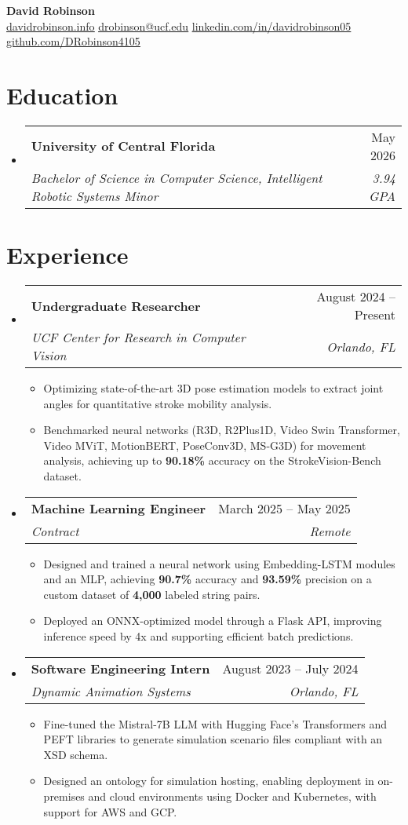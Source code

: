 \documentclass[letterpaper,11pt]{article}
\makeatletter
\newcommand{\resumeItem}[1]{
  \item\small{
    {#1 \vspace{-2pt}}
  }
}
\newcommand{\resumeSubheading}[4]{
  \vspace{-2pt}\item
    \begin{tabular*}{0.97\textwidth}[t]{l@{\extracolsep{\fill}}r}
      \textbf{#1} & #2 \\
      \textit{\small#3} & \textit{\small #4} \\
    \end{tabular*}\vspace{-7pt}
}
\newcommand{\resumeSubHeadingListStart}{\begin{itemize}[leftmargin=0.15in, label={}]}
\newcommand{\resumeSubHeadingListEnd}{\end{itemize}}
\newcommand{\resumeItemListStart}{\begin{itemize}}
\newcommand{\resumeItemListEnd}{\end{itemize}\vspace{-5pt}}
\makeatother
\begin{document}
\begin{center}
  \textbf{\Huge David Robinson} \\ \vspace{2pt} \small
  \faCode\hspace{0.25pt} \href{https://www.davidrobinson.info/}{\uline{davidrobinson.info}}
  \faEnvelope\hspace{0.25pt} \href{mailto:drobinson@ucf.edu}{\uline{drobinson@ucf.edu}}
  \faLinkedin\hspace{0.25pt} \href{https://linkedin.com/in/davidrobinson05}{\uline{linkedin.com/in/davidrobinson05}}
  \faGithub\hspace{0.25pt} \href{https://github.com/DRobinson4105}{\uline{github.com/DRobinson4105}}
\end{center}

\section{Education}
  \resumeSubHeadingListStart
    \resumeSubheading
      {University of Central Florida}{May 2026}
      {Bachelor of Science in Computer Science, Intelligent Robotic Systems Minor}{3.94 GPA}
  \resumeSubHeadingListEnd

\section{Experience}
  \resumeSubHeadingListStart
  \resumeSubheading
    {Undergraduate Researcher}{August 2024 -- Present}
    {UCF Center for Research in Computer Vision}{Orlando, FL}
    \resumeItemListStart
      \resumeItem{Optimizing state-of-the-art 3D pose estimation models to extract joint angles for quantitative stroke mobility analysis.}
      \resumeItem{Benchmarked neural networks (R3D, R2Plus1D, Video Swin Transformer, Video MViT, MotionBERT, PoseConv3D, MS-G3D) for movement analysis, achieving up to \textbf{90.18\%} accuracy on the StrokeVision-Bench dataset.}
    \resumeItemListEnd
    \resumeSubheading
      {Machine Learning Engineer}{March 2025 -- May 2025}
      {Contract}{Remote}
      \resumeItemListStart
        \resumeItem{Designed and trained a neural network using Embedding-LSTM modules and an MLP, achieving \textbf{90.7\%} accuracy and \textbf{93.59\%} precision on a custom dataset of \textbf{4,000} labeled string pairs.}
        \resumeItem{Deployed an ONNX-optimized model through a Flask API, improving inference speed by 4x and supporting efficient batch predictions.}
      \resumeItemListEnd
    \resumeSubheading
      {Software Engineering Intern}{August 2023 -- July 2024}
      {Dynamic Animation Systems}{Orlando, FL}
      \resumeItemListStart
        \resumeItem{Fine-tuned the Mistral-7B LLM with Hugging Face's Transformers and PEFT libraries to generate simulation scenario files compliant with an XSD schema.}
        \resumeItem{Designed an ontology for simulation hosting, enabling deployment in on-premises and cloud environments using Docker and Kubernetes, with support for AWS and GCP.}
      \resumeItemListEnd
  \resumeSubHeadingListEnd
  
\end{document}
